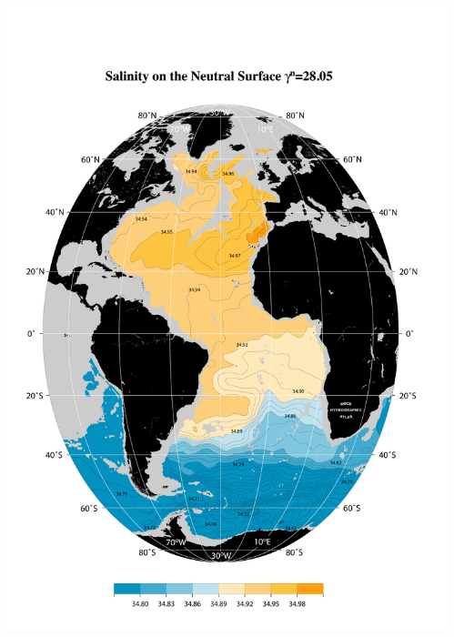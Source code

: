 \documentclass{beamer}
\begin{document}
\begin{frame}[plain,t]

    \begin{columns}
      \begin{column}{0.5\textwidth}
          \includegraphics[width=\textwidth]{salnty_isopyc_jpg/gam2805_sal.jpg}
       \end{column}
      \begin{column}{0.5\textwidth}

\end{column}
\end{columns}
\end{frame}
\end{document}
